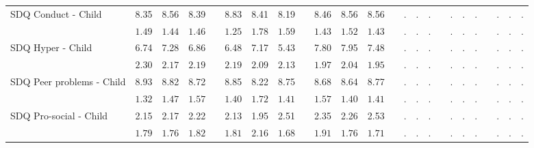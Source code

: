 \begin{center}
{\begin{longtable}{L{12em} c c c p{1.2em} c c c p{1.2em} c c c p{1.2em} c c c p{1.2em} c c c p{1.2em} c c c}
SDQ Conduct - Child & 8.35 &      8.56 &      8.39 & &      8.83 &      8.41 &      8.19 & &      8.46 &      8.56 &      8.56 & &         . &         . &         . & &         . &         . &         . & &         . &         . &         . \\*
& $\mathit{     1.49}$ & $\mathit{     1.44}$ & $\mathit{     1.46}$ & & $\mathit{     1.25}$ & $\mathit{     1.78}$ & $\mathit{     1.59}$ & & $\mathit{     1.43}$ & $\mathit{     1.52}$ & $\mathit{     1.43}$ & & $\mathit{        .}$ & $\mathit{        .}$ & $\mathit{        .}$ & & $\mathit{        .}$ & $\mathit{        .}$ & $\mathit{        .}$ & & $\mathit{        .}$ & $\mathit{        .}$ & $\mathit{        .}$ \\[.7em]
SDQ Hyper - Child & 6.74 &      7.28 &      6.86 & &      6.48 &      7.17 &      5.43 & &      7.80 &      7.95 &      7.48 & &         . &         . &         . & &         . &         . &         . & &         . &         . &         . \\*
& $\mathit{     2.30}$ & $\mathit{     2.17}$ & $\mathit{     2.19}$ & & $\mathit{     2.19}$ & $\mathit{     2.09}$ & $\mathit{     2.13}$ & & $\mathit{     1.97}$ & $\mathit{     2.04}$ & $\mathit{     1.95}$ & & $\mathit{        .}$ & $\mathit{        .}$ & $\mathit{        .}$ & & $\mathit{        .}$ & $\mathit{        .}$ & $\mathit{        .}$ & & $\mathit{        .}$ & $\mathit{        .}$ & $\mathit{        .}$ \\[.7em]
SDQ Peer problems - Child & 8.93 &      8.82 &      8.72 & &      8.85 &      8.22 &      8.75 & &      8.68 &      8.64 &      8.77 & &         . &         . &         . & &         . &         . &         . & &         . &         . &         . \\*
& $\mathit{     1.32}$ & $\mathit{     1.47}$ & $\mathit{     1.57}$ & & $\mathit{     1.40}$ & $\mathit{     1.72}$ & $\mathit{     1.41}$ & & $\mathit{     1.57}$ & $\mathit{     1.40}$ & $\mathit{     1.41}$ & & $\mathit{        .}$ & $\mathit{        .}$ & $\mathit{        .}$ & & $\mathit{        .}$ & $\mathit{        .}$ & $\mathit{        .}$ & & $\mathit{        .}$ & $\mathit{        .}$ & $\mathit{        .}$ \\[.7em]
SDQ Pro-social - Child & 2.15 &      2.17 &      2.22 & &      2.13 &      1.95 &      2.51 & &      2.35 &      2.26 &      2.53 & &         . &         . &         . & &         . &         . &         . & &         . &         . &         . \\*
& $\mathit{     1.79}$ & $\mathit{     1.76}$ & $\mathit{     1.82}$ & & $\mathit{     1.81}$ & $\mathit{     2.16}$ & $\mathit{     1.68}$ & & $\mathit{     1.91}$ & $\mathit{     1.76}$ & $\mathit{     1.71}$ & & $\mathit{        .}$ & $\mathit{        .}$ & $\mathit{        .}$ & & $\mathit{        .}$ & $\mathit{        .}$ & $\mathit{        .}$ & & $\mathit{        .}$ & $\mathit{        .}$ & $\mathit{        .}$ \\[.7em]

\end{longtable}}
\end{center}
